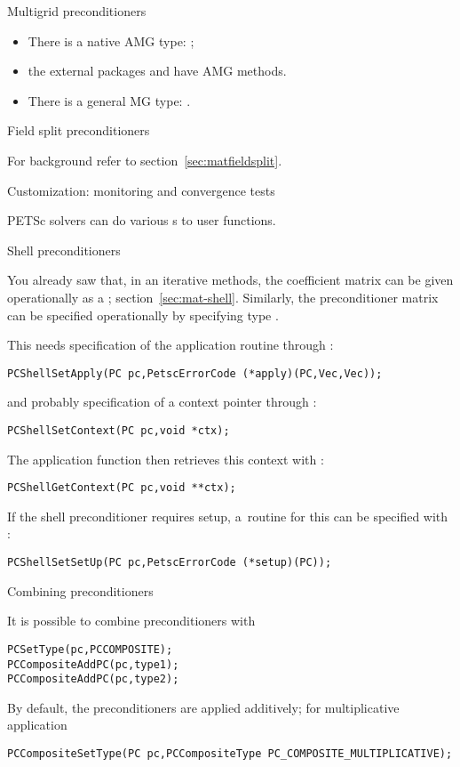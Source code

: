  {Multigrid preconditioners}

\begin{itemize}
\item There is a native \ac{AMG} type: ;
\item the external packages  and  have
  \ac{AMG} methods.
\item There is a general \ac{MG} type: .
\end{itemize}

 {Field split preconditioners}

For background refer to section~\ref{sec:matfieldsplit}.

 {Customization: monitoring and convergence tests}

PETSc solvers can do various s to user functions.

 {Shell preconditioners}

You already saw that,
in an iterative methods, the coefficient matrix can be given operationally
as a ; section~\ref{sec:mat-shell}.
Similarly, the preconditioner matrix can be specified operationally
by specifying type .

This needs specification of the application routine
through :
\begin{lstlisting}
PCShellSetApply(PC pc,PetscErrorCode (*apply)(PC,Vec,Vec));
\end{lstlisting}
and probably specification of a context pointer through
:
\begin{lstlisting}
PCShellSetContext(PC pc,void *ctx);
\end{lstlisting}
The application function then retrieves this context with
:
\begin{lstlisting}
PCShellGetContext(PC pc,void **ctx);
\end{lstlisting}

If the shell preconditioner requires setup, a~routine for this can be specified with
:
\begin{lstlisting}
PCShellSetSetUp(PC pc,PetscErrorCode (*setup)(PC));
\end{lstlisting}

 {Combining preconditioners}

It is possible to combine preconditioners with 
\begin{lstlisting}
PCSetType(pc,PCCOMPOSITE);
PCCompositeAddPC(pc,type1);
PCCompositeAddPC(pc,type2);
\end{lstlisting}
By default, the preconditioners are applied additively;
for multiplicative application
\begin{lstlisting}
PCCompositeSetType(PC pc,PCCompositeType PC_COMPOSITE_MULTIPLICATIVE);
\end{lstlisting}


